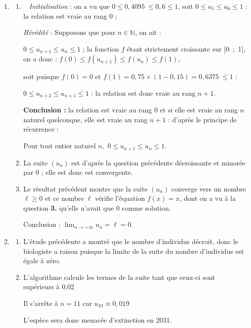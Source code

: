 \documentclass[10pt]{article}
\providecommand{\N}{\mathbb{N}}
\providecommand{\np}[2][]{{#2~#1}}
\begin{document}
\begin{enumerate}[resume]
\item 
	\begin{enumerate}
		\item ~
\emph{Initialisation} : on a vu que $0 \leqslant \np{0,4095} \leqslant 0,6 \leqslant 1$, soit $0 \leqslant u_1 \leqslant u_0\leqslant 1$ : la relation est vraie au rang $0$ ;

\emph{Hérédité} : Supposons que pour $n \in \N$, on ait :

$0 \leqslant u_{n+1} \leqslant  u_n \leqslant 1$ ; la fonction $f$ étant strictement croissante sur [0~;~1], on a donc :
$f(0) \leqslant f\left(u_{n+1}\right) \leqslant f\left(u_n\right) \leqslant f(1)$, 

soit puisque $f(0) = 0$ et $f(1) = 0,75 \times (1 - 0,15) = \np{0,6375} \leqslant 1$ :

$0 \leqslant u_{n+2} \leqslant u_{n+1} \leqslant  1$ : la relation est donc vraie au rang $n + 1$.

\textbf{Conclusion :} la relation est vraie au rang 0 et si elle est vraie au rang $n$ naturel quelconque, elle est vraie au rang $n+1$ : d'après le principe de récurrence :

Pour tout entier naturel $n$,\, $0 \leqslant u_{n+1} \leqslant  u_n \leqslant 1$.	
		
		\item 
La suite $\left(u_n\right)$ est d'après la question précédente décroissante et minorée par $0$ ; elle est donc est convergente.
		\item 
Le résultat précédent montre que la suite $\left(u_n\right)$ converge vers un nombre $\ell \geqslant 0$ et ce nombre $\ell$ vérifie l'équation $f(x) = x$, dont on a vu à la question \textbf{3.} qu'elle n'avait que $0$ comme solution.
		
Conclusion : $\displaystyle\lim_{n \to + \infty} u_n = \ell = 0$.
	\end{enumerate}
\item 
	\begin{enumerate}
		\item 
L'étude précédente a montré que le nombre d'individus décroit, donc le biologiste a raison puisque la limite de la suite du nombre d'individus est égale à zéro.
		\item 
















L'algorithme calcule les termes de la suite tant que ceux-ci sont supérieurs à 0,02

Il s'arrête à $n = 11$ car $u_{10} \approx 0,019$

L'espèce sera donc menacée d'extinction en 2031.

	\end{enumerate}
\end{enumerate}
\end{document}
